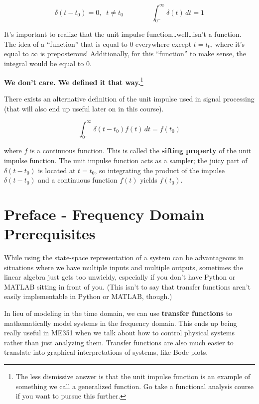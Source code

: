 \documentclass[
  letterpaper,
  DIV=11,
  numbers=noendperiod]{scrreprt}
\begin{document}
\[\delta(t-t_0)=0, \; \; t\neq t_0 \qquad \qquad \int_{0^-}^\infty \delta(t) \, dt = 1\]

It's important to realize that the unit impulse
function\ldots well\ldots isn't a function. The idea of a ``function''
that is equal to 0 everywhere except \(t=t_0\), where it's equal to
\(\infty\) is preposterous! Additionally, for this ``function'' to make
sense, the integral would be equal to 0.

\textbf{We don't care. We defined it that way.}\footnote{The less
  dismissive answer is that the unit impulse function is an example of
  something we call a generalized function. Go take a functional
  analysis course if you want to pursue this further.}

There exists an alternative definition of the unit impulse used in
signal processing (that will also end up useful later on in this
course).

\[\int_{0^-}^\infty \delta(t-t_0) f(t)\, dt = f(t_0)\]

where \(f\) is a continuous function. This is called the \textbf{sifting
property} of the unit impulse function. The unit impulse function acts
as a sampler; the juicy part of \(\delta(t-t_0)\) is located at
\(t=t_0\), so integrating the product of the impulse \(\delta(t-t_0)\)
and a continuous function \(f(t)\) yields \(f(t_0)\).

\hypertarget{preface---frequency-domain-prerequisites}{%
\section*{Preface - Frequency Domain
Prerequisites}\label{preface---frequency-domain-prerequisites}}


While using the state-space representation of a system can be
advantageous in situations where we have multiple inputs and multiple
outputs, sometimes the linear algebra just gets too unwieldy, especially
if you don't have Python or MATLAB sitting in front of you. (This isn't
to say that transfer functions aren't easily implementable in Python or
MATLAB, though.)

In lieu of modeling in the time domain, we can use \textbf{transfer
functions} to mathematically model systems in the frequency domain. This
ends up being really useful in ME351 when we talk about how to control
physical systems rather than just analyzing them. Transfer functions are
also much easier to translate into graphical interpretations of systems,
like Bode plots.
\end{document}
